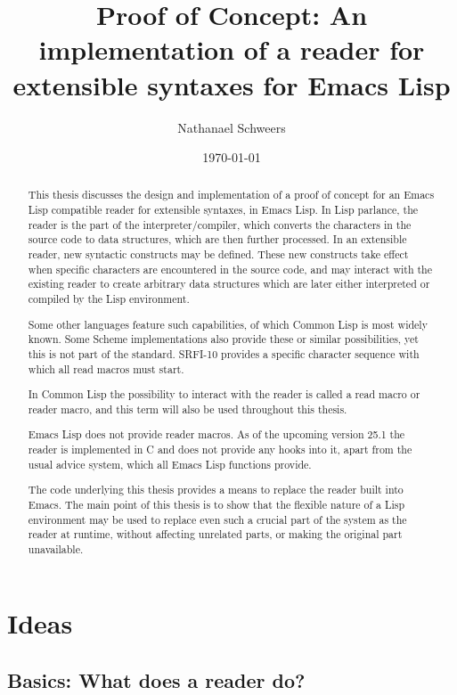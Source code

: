 \documentclass[a4paper]{article}
\author{Nathanael Schweers}
\date{\today}
\title{Proof of Concept: An implementation of a reader for extensible syntaxes for Emacs Lisp}
\newcommand{\el}{Emacs Lisp}
\newcommand{\cl}{Common Lisp}
\begin{document}
\maketitle
\tableofcontents

\begin{abstract}
  This thesis discusses the design and implementation of a proof of concept for
  an \el{} compatible reader for extensible syntaxes, in \el{}.  In Lisp
  parlance, the reader is the part of the interpreter/compiler, which converts
  the characters in the source code to data structures, which are then further
  processed.  In an extensible reader, new syntactic constructs may be defined.
  These new constructs take effect when specific characters are encountered in
  the source code, and may interact with the existing reader to create arbitrary
  data structures which are later either interpreted or compiled by the Lisp
  environment.

  Some other languages feature such capabilities, of which \cl{} is most widely
  known.  Some Scheme implementations also provide these or similar
  possibilities, yet this is not part of the standard.  SRFI-10 provides a
  specific character sequence with which all read macros must
  start. \cite{srfi-10}

  In \cl{} the possibility to interact with the reader is called a read macro or
  reader macro, and this term will also be used throughout this thesis.

  \el{} does not provide reader macros.  As of the upcoming version 25.1 the
  reader is implemented in C and does not provide any hooks into it, apart from
  the usual advice system, which all \el{} functions provide.

  The code underlying this thesis provides a means to replace the reader built
  into Emacs.  The main point of this thesis is to show that the flexible nature
  of a Lisp environment may be used to replace even such a crucial part of the
  system as the reader at runtime, without affecting unrelated parts, or making
  the original part unavailable.
\end{abstract}

\section{Ideas}
\label{sec-1}
\subsection{Basics: What does a reader do?}
\label{sec-1-1}
\end{document}
